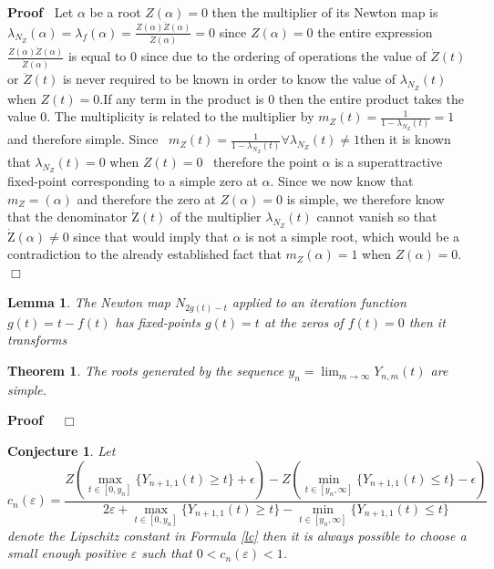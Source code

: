 \documentclass{elsarticle}
\newcommand{\Zeta}{\mathrm{Z}}
\newenvironment{proof}{\noindent\textbf{Proof\ }}{\hspace*{\fill}$\Box$\medskip}
\newtheorem{conjecture}{Conjecture}
\newtheorem{lemma}{Lemma}
{\theorembodyfont{\rmfamily}\newtheorem{note}{Note}}
\newtheorem{theorem}{Theorem}
\begin{document}
\begin{proof}
  Let $\alpha$ be a root $Z (\alpha) = 0$ then the multiplier of its Newton
  map is $\lambda_{N_Z} (\alpha) = \lambda_f (\alpha) = \frac{Z (\alpha)
  \ddot{Z} (\alpha)}{\dot{Z} (\alpha)} = 0$ since $Z (\alpha) = 0$ the entire
  expression $\frac{Z (\alpha) \ddot{Z} (\alpha)}{\dot{Z} (\alpha)}$ is equal
  to 0 since due to the ordering of operations the value of $\dot{Z} (t)$ or
  $\ddot{Z} (t)$ is never required to be known in order to know the value of
  $\lambda_{N_Z} (t)$ when $Z (t) = 0$.\quad If any term in the product is 0
  then the entire product takes the value 0. The multiplicity is related to
  the multiplier by $m_Z (t) = \frac{1}{1 - \lambda_{N_Z} (t)} = 1$ and
  therefore simple. Since \ $m_Z (t) = \frac{1}{1 - \lambda_{N_Z} (t)} \forall
  \lambda_{N_Z} (t) \neq 1$then it is known that $\lambda_{N_Z} (t) = 0$ when
  $Z (t_{}) = 0$ \ therefore the point $\alpha$ is a superattractive
  fixed-point corresponding to a simple zero at $\alpha$. Since we now know
  that $m_Z = (\alpha)$ and therefore the zero at $Z (\alpha) = 0$ is simple,
  we therefore know that the denominator $\dot{\Zeta} (t)$ of the multiplier
  $\lambda_{N_Z} (t)$ cannot vanish so that \ \ $\dot{\Zeta} (\alpha) \neq 0$
  since that would imply that $\alpha$ is not a simple root, which would be a
  contradiction to the already established fact that $m_Z (\alpha) = 1$ when
  $Z (\alpha) = 0$.
\end{proof}

\begin{lemma}
  The Newton map $N_{2 g (t) - t}$ applied to an iteration function $g (t) = t
  - f (t)$ has fixed-points $g (t) = t$ at the zeros of $f (t) = 0$ then it
  transforms
\end{lemma}

\begin{theorem}
  The roots generated by the sequence $y_n = \lim_{m \rightarrow \infty} Y_{n,
  m} (t)$ are simple.
\end{theorem}

\begin{proof}
  \ 
\end{proof}

\begin{conjecture}
  Let
  \begin{equation}
    c_n (\varepsilon) = \frac{Z (\max_{t \in [0, y_n]} \{ Y_{n + 1, 1} (t)
    \geqslant t \} + \epsilon) - Z (\min_{t \in [y_n, \infty]} \{ Y_{n + 1, 1}
    (t) \leqslant t \} - \epsilon)}{2 \varepsilon + \max_{t \in [0, y_n]} \{
    Y_{n + 1, 1} (t) \geqslant t \} - \min_{t \in [y_n, \infty]} \{ Y_{n + 1,
    1} (t) \leqslant t \}}
  \end{equation}
  denote the Lipschitz constant in Formula \ref{lc} then it is always possible
  to choose a small enough positive $\varepsilon$ such that $0 < c_n
  (\varepsilon) < 1$.
\end{conjecture}
\end{document}
